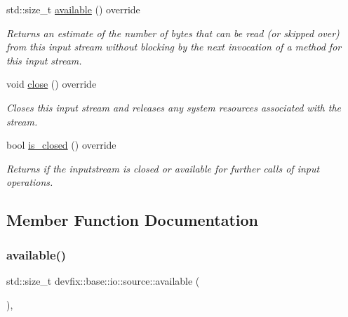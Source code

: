 \begin{DoxyCompactItemize}
std\+::size\+\_\+t \hyperlink{structdevfix_1_1base_1_1io_1_1source_a911f4ba79499a623de30cf16d3d26d47}{available} () override
\begin{DoxyCompactList}\small\item\em Returns an estimate of the number of bytes that can be read (or skipped over) from this input stream without blocking by the next invocation of a method for this input stream. \end{DoxyCompactList}\item 
void \hyperlink{structdevfix_1_1base_1_1io_1_1source_aa00a381c8a166cbbc5dbf6de4b56590e}{close} () override
\begin{DoxyCompactList}\small\item\em Closes this input stream and releases any system resources associated with the stream. \end{DoxyCompactList}\item 
bool \hyperlink{structdevfix_1_1base_1_1io_1_1source_a406834cf6651d48949b96d0ef49cc6c1}{is\+\_\+closed} () override
\begin{DoxyCompactList}\small\item\em Returns if the {\itshape inputstream} is closed or available for further calls of input operations. \end{DoxyCompactList}\end{DoxyCompactItemize}


\subsection{Member Function Documentation}
\mbox{\label{structdevfix_1_1base_1_1io_1_1source_a911f4ba79499a623de30cf16d3d26d47}} 
\subsubsection{\texorpdfstring{available()}{available()}}
{\footnotesize\ttfamily std\+::size\+\_\+t devfix\+::base\+::io\+::source\+::available (\begin{DoxyParamCaption}{ }\end{DoxyParamCaption})\hspace{0.3cm}{\ttfamily [override]}, {\ttfamily [virtual]}}



